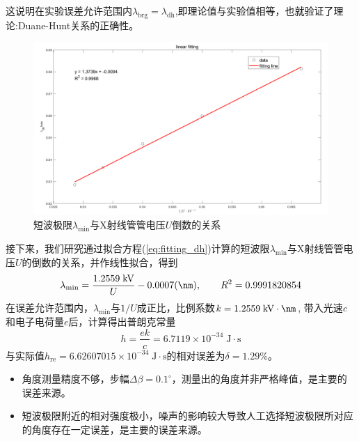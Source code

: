 \documentclass[10.5pt]{article}
\renewcommand{\=}[1]{\stackrel{#1}{=}} %
\theoremstyle{definition}
\theoremstyle{remark}
\begin{document}
	这说明在实验误差允许范围内$\lambda_{\text{brg}}=\lambda_{\text{dh}}$,即理论值与实验值相等，也就验证了理论:Duane-Hunt关系的正确性。
	\begin{figure}[H]
		\centering
		\includegraphics[scale=0.45]{lu.png}
		\captionsetup{font=footnotesize}
		\caption{短波极限$\lambda_{\min}$与X射线管管电压$U$倒数的关系}
	\end{figure}
	接下来，我们研究通过拟合方程(\ref{eq:fitting_dh})计算的短波限$\lambda_{\min}$与X射线管管电压$U$的倒数的关系，并作线性拟合，得到
	\begin{equation}
		\lambda_{\min}=\dfrac{1.2559\;\text{kV}}{U}-0.0007 (\nm),\qquad R^2=0.9991820854
	\end{equation}
	在误差允许范围内，$\lambda_{\min}$与$1/U$成正比，比例系数$k=1.2559\;\text{kV}\cdot\nm$, 带入光速$c$和电子电荷量$e$后，计算得出普朗克常量
	\begin{equation}
		h=\dfrac{ek}{c}=6.7119\times10^{-34}\;\text{J}\cdot\text{s}
	\end{equation}
	与实际值$h_{\text{re}}=6.62607015\times10^{-34}\;\text{J}\cdot\text{s}$的相对误差为$\delta=1.29\%$。
	
	\begin{itemize}
		\item 角度测量精度不够，步幅$\Delta\beta=0.1^\circ$，测量出的角度并非严格峰值，是主要的误差来源。
		\item 短波极限附近的相对强度极小，噪声的影响较大导致人工选择短波极限所对应的角度存在一定误差，是主要的误差来源。
	\end{itemize}
\end{document}
